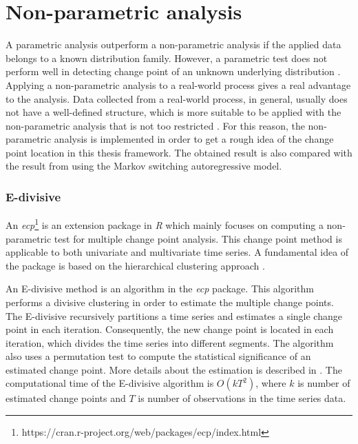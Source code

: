 \section{Non-parametric analysis}

A parametric analysis outperform a non-parametric analysis if the
applied data belongs to a known distribution family. However, a parametric
test does not perform well in detecting change point of an unknown
underlying distribution \citep{sharkey2014nonparametric}. Applying
a non-parametric analysis to a real-world process gives a real advantage
to the analysis. Data collected from a real-world process, in general,
usually does not have a well-defined structure, which is more suitable
to be applied with the non-parametric analysis that is not too restricted
\citep{hawkins2010nonparametric}. For this reason, the non-parametric
analysis is implemented in order to get a rough idea of the change
point location in this thesis framework. The obtained result is also
compared with the result from using the Markov switching autoregressive
model.

\subsubsection*{E-divisive}

An \emph{ecp}\footnote{https://cran.r-project.org/web/packages/ecp/index.html}
is an extension package in \emph{R} which mainly focuses on computing
a non-parametric test for multiple change point analysis. This change
point method is applicable to both univariate and multivariate time
series. A fundamental idea of the package is based on the hierarchical
clustering approach \citep{james2013ecp}. 

An E-divisive method is an algorithm in the \emph{ecp} package. This
algorithm performs a divisive clustering in order to estimate the
multiple change points. The E-divisive recursively partitions a time
series and estimates a single change point in each iteration. Consequently,
the new change point is located in each iteration, which divides the
time series into different segments. The algorithm also uses a permutation
test to compute the statistical significance of an estimated change
point. More details about the estimation is described in \citet{matteson2014nonparametric}.
The computational time of the E-divisive algorithm is $O(kT^{2})$,
where $k$ is number of estimated change points and $T$ is number
of observations in the time series data.


